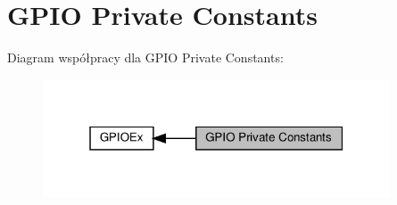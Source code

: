 \hypertarget{group___g_p_i_o_ex___private___constants}{}\section{G\+P\+IO Private Constants}
\label{group___g_p_i_o_ex___private___constants}
Diagram współpracy dla G\+P\+IO Private Constants\+:\nopagebreak
\begin{figure}[H]
\begin{center}
\leavevmode
\includegraphics[width=292pt]{group___g_p_i_o_ex___private___constants}
\end{center}
\end{figure}
